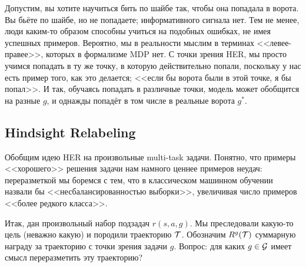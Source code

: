 \begin{exampleBox}[righthand ratio=0.3, sidebyside, sidebyside align=center, lower separated=false]{}
Допустим, вы хотите научиться бить по шайбе так, чтобы она попадала в ворота. Вы бьёте по шайбе, но не попадаете; информативного сигнала нет. Тем не менее, люди каким-то образом способны учиться на подобных ошибках, не имея успешных примеров. Вероятно, мы в реальности мыслим в терминах <<левее-правее>>, которых в формализме MDP нет. С точки зрения HER, мы просто учимся попадать в ту же точку, в которую действительно попали, поскольку у нас есть пример того, как это делается; <<если бы ворота были в этой точке, я бы попал>>. И так, обучаясь попадать в различные точки, модель может обобщится на разные $g$, и однажды попадёт в том числе в реальные ворота $g^*$.

\tcblower
{}
\end{exampleBox}

\subsection{Hindsight Relabeling}

Обобщим идею HER на произвольные multi-task задачи. Понятно, что примеры <<хорошего>> решения задачи нам намного ценнее примеров неудач: переразметкой мы боремся с тем, что в классическом машинном обучении назвали бы <<несбалансированностью выборки>>, увеличивая число примеров <<более редкого класса>>.

Итак, дан произвольный набор подзадач $r(s, a, g)$. Мы преследовали какую-то цель (неважно какую) и породили траекторию $\mathcal{T}$. Обозначим $R^g(\mathcal{T})$ суммарную награду за траекторию с точки зрения задачи $g$. Вопрос: для каких $g \in \mathcal{G}$ имеет смысл переразметить эту траекторию? 

